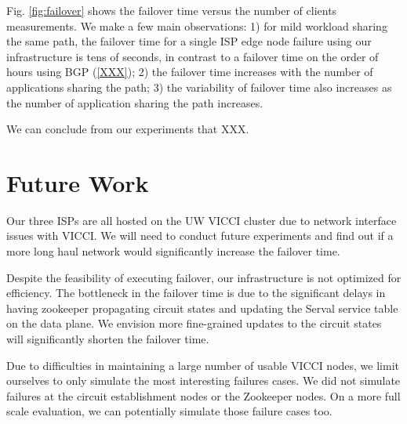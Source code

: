 \documentclass{article}
\begin{document}
Fig. \ref{fig:failover} shows the failover time versus the number of clients
measurements. We make a few main observations: 1) for mild workload sharing
the same path, the failover time for a single ISP edge node failure using our infrastructure
is tens of seconds, in contrast to a failover time on the order of hours using BGP (\ref{XXX});
2) the failover time increases with the number of applications sharing the path;
3) the variability of failover time also increases as the number of application sharing the path increases.

We can conclude from our experiments that XXX.

\section{Future Work}
Our three ISPs are all hosted on the UW VICCI cluster due to network interface issues with VICCI. We will need to conduct future experiments and find out if a more long haul network would significantly increase the failover time.

Despite the feasibility of executing failover, our infrastructure is not optimized for efficiency. The bottleneck in the failover time is due to the significant delays in having zookeeper propagating circuit states and updating the Serval service table on the data plane. We envision more fine-grained updates to the circuit states will significantly shorten the failover time.

Due to difficulties in maintaining a large number of usable VICCI nodes, we limit ourselves to only simulate the most interesting failures cases. We did not simulate failures at the circuit establishment nodes or the Zookeeper nodes. On a more full scale evaluation, we can potentially simulate those failure cases too.



\end{document}
